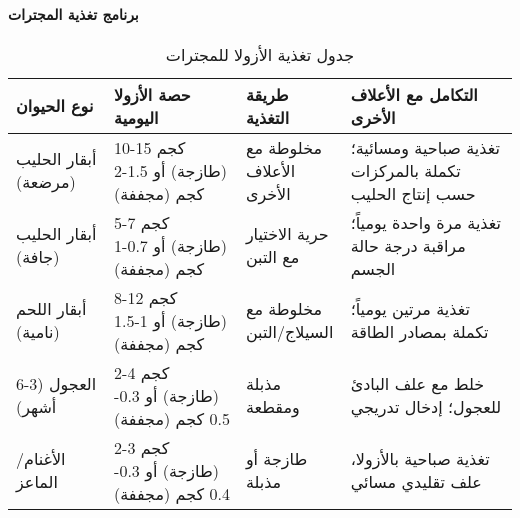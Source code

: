 \paragraph{برنامج تغذية المجترات}
\begin{table}[h]
\centering
\caption{جدول تغذية الأزولا للمجترات}
\label{tab:ruminant_feeding}
\begin{tabular}{|p{2.5cm}|p{2.5cm}|p{2.5cm}|p{4.5cm}|}
\hline
\textbf{نوع الحيوان} & \textbf{حصة الأزولا اليومية} & \textbf{طريقة التغذية} & \textbf{التكامل مع الأعلاف الأخرى} \\
\hline
أبقار الحليب (مرضعة) & 10-15 كجم (طازجة) أو 1.5-2 كجم (مجففة) & مخلوطة مع الأعلاف الأخرى & تغذية صباحية ومسائية؛ تكملة بالمركزات حسب إنتاج الحليب \\
\hline
أبقار الحليب (جافة) & 5-7 كجم (طازجة) أو 0.7-1 كجم (مجففة) & حرية الاختيار مع التبن & تغذية مرة واحدة يومياً؛ مراقبة درجة حالة الجسم \\
\hline
أبقار اللحم (نامية) & 8-12 كجم (طازجة) أو 1-1.5 كجم (مجففة) & مخلوطة مع السيلاج/التبن & تغذية مرتين يومياً؛ تكملة بمصادر الطاقة \\
\hline
العجول (3-6 أشهر) & 2-4 كجم (طازجة) أو 0.3-0.5 كجم (مجففة) & مذبلة ومقطعة & خلط مع علف البادئ للعجول؛ إدخال تدريجي \\
\hline
الأغنام/الماعز & 2-3 كجم (طازجة) أو 0.3-0.4 كجم (مجففة) & طازجة أو مذبلة & تغذية صباحية بالأزولا، علف تقليدي مسائي \\
\hline
\end{tabular}
\end{table}

